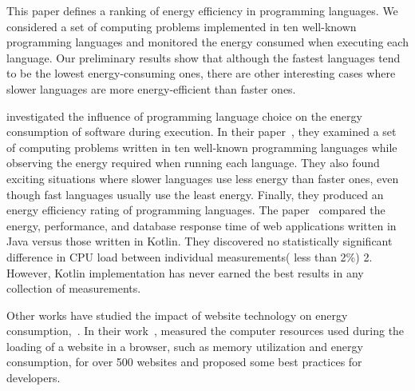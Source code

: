 This paper defines a ranking of energy efficiency in programming languages. We considered a set of computing problems implemented in ten well-known programming languages and monitored the energy consumed when executing each language. Our preliminary results show that although the fastest languages tend to be the lowest energy-consuming ones, there are other interesting cases where slower languages are more energy-efficient than faster ones.

\citeauthor{couto2017towards} investigated the influence of programming language choice on the energy consumption of software during execution. In their paper~\cite{couto2017towards}, they examined a set of computing problems written in ten well-known programming languages while observing the energy required when running each language. They also found exciting situations where slower languages use less energy than faster ones, even though fast languages usually use the least energy.
Finally, they produced an energy efficiency rating of programming languages.
The paper~\cite{bujnowski2020java} compared the energy, performance, and database response time of web applications written in Java versus those written in Kotlin. They discovered no statistically significant difference in CPU load between individual measurements( less than 2\%) 2. However, Kotlin implementation has never earned the best results in any collection of measurements.

Other works have studied the impact of website technology on energy consumption,~\cite{philippot_characterization_2014,manotas_investigating_2013}. In their work~\cite{philippot_characterization_2014},\citeauthor{philippot_characterization_2014} measured the computer resources used during the loading of a website in a browser, such as memory utilization and energy consumption, for over 500 websites and proposed some best practices for developers.


